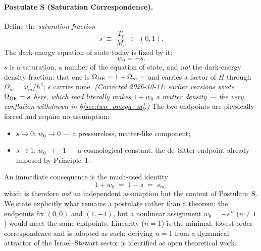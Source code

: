 \documentclass[12pt,a4paper]{article}
\begin{document}
\paragraph{Postulate S (Saturation Correspondence).}
Define the \emph{saturation fraction}
\begin{equation}
  s \;\equiv\; \frac{T_r}{M_v} \;\in\;(0,1).
  \label{eq:sat_fraction}
\end{equation}
The dark-energy equation of state today is fixed by it:
\begin{equation}
  w_0 = -s.
  \label{eq:sat_correspondence}
\end{equation}
$s$ is a saturation, a number of the equation of state, and \emph{not} the
dark-energy density fraction: that one is $\Omega_{\rm DE}=1-\Omega_m=\val{OMDE_DENS_d6}$
and carries a factor of $H$ through $\Omega_m=\omega_m/h^2$; $s$ carries none.
\emph{(Corrected 2026-10-11: earlier versions wrote $\Omega_{\rm DE}=s$ here,
which read literally makes $1+w_0$ a matter density --- the very conflation
withdrawn in \S\ref{sec:two_omega_m}.)}
The two endpoints are physically forced and require no assumption:
\begin{itemize}\itemsep2pt
  \item $s\to0$: $w_0\to0$ --- a pressureless, matter-like component;
  \item $s\to1$: $w_0\to-1$ --- a cosmological constant, the de~Sitter
        endpoint already imposed by Principle~1.
\end{itemize}
An immediate consequence is the much-used identity
\begin{equation}
  1 + w_0 \;=\; 1 - s \;=\; s_m,
  \label{eq:1pw0_identity}
\end{equation}
which is therefore \emph{not} an independent assumption but the content of
Postulate~S. We state explicitly what remains a postulate rather than a
theorem: the endpoints fix $(0,0)$ and $(1,-1)$, but a nonlinear assignment
$w_0=-s^{\,n}$ ($n\neq1$) would meet the same endpoints. Linearity ($n=1$) is
the minimal, lowest-order correspondence and is adopted as such; deriving
$n=1$ from a dynamical attractor of the Israel--Stewart sector is identified
as open theoretical work.
\end{document}

